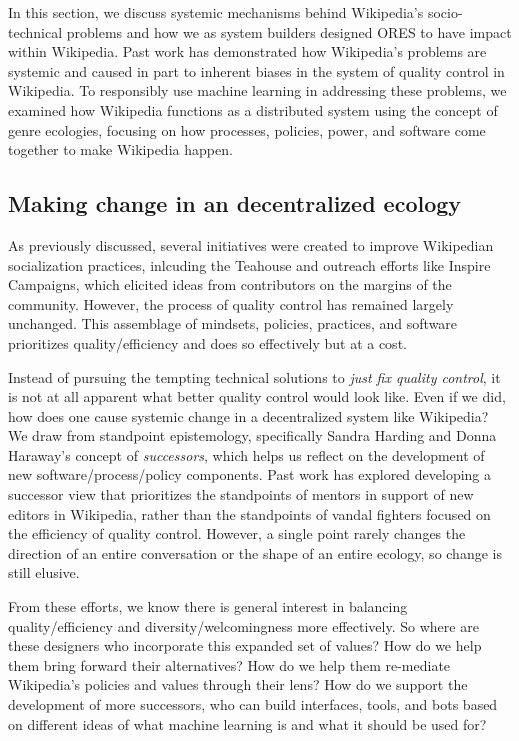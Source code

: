 In this section, we discuss systemic mechanisms behind Wikipedia's socio-technical problems and how we as system builders designed ORES to have impact within Wikipedia.  Past work has demonstrated how Wikipedia's problems are systemic and caused in part to inherent biases in the system of quality control in Wikipedia. To responsibly use machine learning in addressing these problems, we examined how Wikipedia functions as a distributed system using the concept of genre ecologies, focusing on how processes, policies, power, and software come together to make Wikipedia happen.

\subsection{Making change in an decentralized ecology}
As previously discussed, several initiatives were created to improve Wikipedian socialization practices, inlcuding the Teahouse and outreach efforts like Inspire Campaigns\cite{morgan2015what}, which elicited ideas from contributors on the margins of the community. However, the process of quality control has remained largely unchanged.  This assemblage of mindsets, policies, practices, and software prioritizes quality/efficiency and does so effectively \cite{geiger2013levee}\cite{halfaker2014snuggle} but at a cost.

Instead of pursuing the tempting technical solutions to \emph{just fix quality control}, it is not at all apparent what better quality control would look like.  Even if we did, how does one cause systemic change in a decentralized system like Wikipedia?  We draw from standpoint epistemology, specifically Sandra Harding and Donna Haraway's concept of \emph{successors}\cite{haraway1988situated}\cite{harding1987feminism}, which helps us reflect on the development of new software/process/policy components.  Past work has explored developing a successor view that prioritizes the standpoints of mentors in support of new editors in Wikipedia, rather than the standpoints of vandal fighters focused on the efficiency of quality control\cite{halfaker2014snuggle}\cite{geiger2014successor}. However, a single point rarely changes the direction of an entire conversation or the shape of an entire ecology, so change is still elusive.

From these efforts, we know there is general interest in balancing quality/efficiency and diversity/welcomingness more effectively.  So where are these designers who incorporate this expanded set of values?  How do we help them bring forward their alternatives?  How do we help them re-mediate Wikipedia's policies and values through their lens?  How do we support the development of more successors, who can build interfaces, tools, and bots based on different ideas of what machine learning is and what it should be used for?

